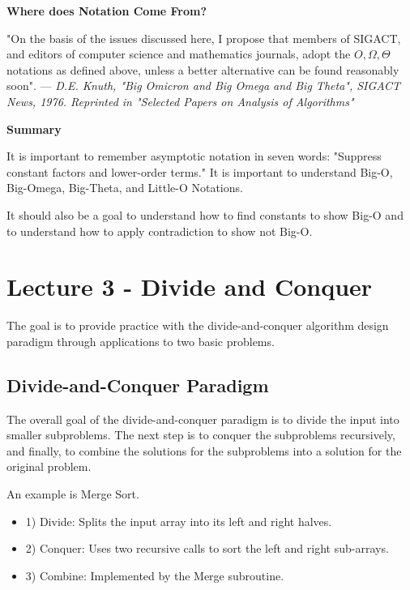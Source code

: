 \documentclass[11pt]{article}
\begin{document}
\vspace{11pt}
\textbf{Where does Notation Come From?}
\vspace{11pt}

"On the basis of the issues discussed here, I propose that members of SIGACT, and editors of computer science and mathematics journals, adopt the $O,\Omega,\Theta$ notations as defined above, unless a better alternative can be found reasonably soon". --- \textit{D.E. Knuth, 
"Big Omicron and Big Omega and Big Theta", SIGACT News, 1976. Reprinted in "Selected Papers on Analysis of Algorithms"}

\vspace{11pt}
\textbf{Summary}
\vspace{11pt}

It is important to remember asymptotic notation in seven words: "Suppress constant factors and lower-order terms." It is important to understand Big-O, Big-Omega, Big-Theta, and Little-O Notations.

It should also be a goal to understand how to find constants to show Big-O and to understand how to apply contradiction to show not Big-O.

\newpage
\section{Lecture 3 - Divide and Conquer}
\vspace{11pt}

The goal is to provide practice with the divide-and-conquer algorithm design paradigm through applications to two basic problems.

\vspace{11pt}
\subsection{Divide-and-Conquer Paradigm}
\vspace{11pt}

The overall goal of the divide-and-conquer paradigm is to divide the input into smaller subproblems. The next step is to conquer the subproblems recursively, and finally, to combine the solutions for the subproblems into a solution for the original problem.

An example is Merge Sort.
\begin{itemize}
    \item 1) Divide: Splits the input array into its left and right halves.
    \item 2) Conquer: Uses two recursive calls to sort the left and right sub-arrays.
    \item 3) Combine: Implemented by the Merge subroutine.
\end{itemize}
\vspace{11pt}
\end{document}
